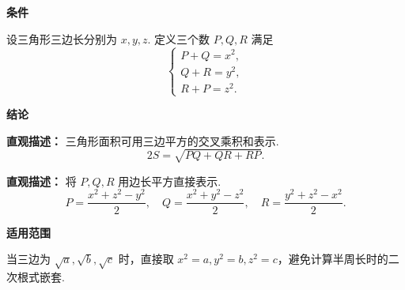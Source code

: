 \begin{statementbox}

\textbf{\textcolor{CStatement}{条件}}
\begin{description}[style=nextline, leftmargin=2.8em, labelsep=0.5em, itemsep=0.35em]
    \item[\textbf{\textcolor{CStatement}{条件1（三边平方组）：}}] 设三角形三边长分别为 $x,y,z$. 定义三个数 $P,Q,R$ 满足
    \[
    \begin{cases}
    P+Q = x^2,\\
    Q+R = y^2,\\
    R+P = z^2.
    \end{cases}
    \]
\end{description}

\textbf{\textcolor{CStatement}{结论}}
\begin{description}[style=nextline, leftmargin=2.8em, labelsep=0.5em, itemsep=0.45em]
    \item[\textbf{\textcolor{CStatement}{结论一（面积对称式）：}}]
    \textbf{\textcolor{CStatement}{直观描述：}} 三角形面积可用三边平方的交叉乘积和表示.
    \[
    2S = \sqrt{PQ + QR + RP}.
    \]

    \item[\textbf{\textcolor{CStatement}{常见变形（中间量显式）：}}]
    \textbf{\textcolor{CStatement}{直观描述：}} 将 $P,Q,R$ 用边长平方直接表示.
    \[
    P = \frac{x^2+z^2-y^2}{2},\quad
    Q = \frac{x^2+y^2-z^2}{2},\quad
    R = \frac{y^2+z^2-x^2}{2}.
    \]
\end{description}

\textbf{\textcolor{CStatement}{适用范围}}
\begin{description}[style=nextline, leftmargin=2.8em, labelsep=0.5em, itemsep=0.35em]
    \item[\textbf{\textcolor{CStatement}{适用场景（根式边长）：}}] 当三边为 $\sqrt{a},\sqrt{b},\sqrt{c}$ 时，直接取 $x^2=a,y^2=b,z^2=c$，避免计算半周长时的二次根式嵌套.
\end{description}

\end{statementbox}
